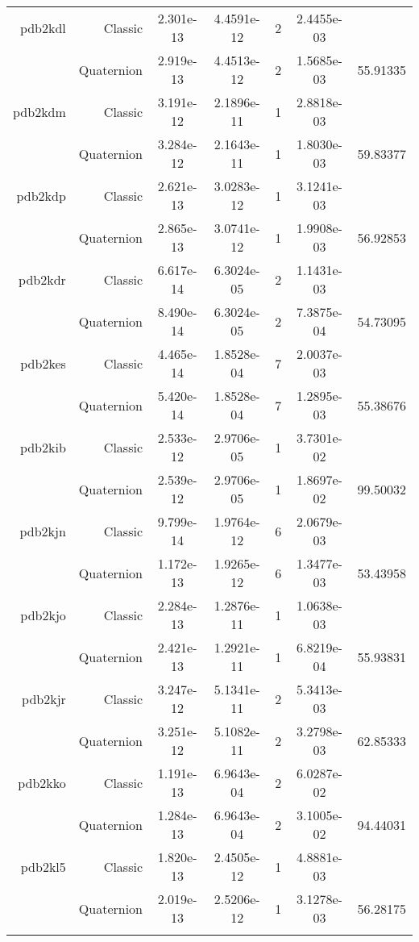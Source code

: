 \begin{xltabular}{\textwidth}{r|rS[table-format=1.3e+2]S[table-format=1.4e+2]cS[table-format=1.4e+2]S[table-format=-1.5]}
pdb2kdl & Classic & 2.301e-13 & 4.4591e-12 & 2 & 2.4455e-03 & \\
& Quaternion & 2.919e-13 & 4.4513e-12 & 2 & 1.5685e-03 & 55.91335\\  \addlinespace
pdb2kdm & Classic & 3.191e-12 & 2.1896e-11 & 1 & 2.8818e-03 & \\
& Quaternion & 3.284e-12 & 2.1643e-11 & 1 & 1.8030e-03 & 59.83377\\  \addlinespace
pdb2kdp & Classic & 2.621e-13 & 3.0283e-12 & 1 & 3.1241e-03 & \\
& Quaternion & 2.865e-13 & 3.0741e-12 & 1 & 1.9908e-03 & 56.92853\\  \addlinespace
pdb2kdr & Classic & 6.617e-14 & 6.3024e-05 & 2 & 1.1431e-03 & \\
& Quaternion & 8.490e-14 & 6.3024e-05 & 2 & 7.3875e-04 & 54.73095\\  \addlinespace
pdb2kes & Classic & 4.465e-14 & 1.8528e-04 & 7 & 2.0037e-03 & \\
& Quaternion & 5.420e-14 & 1.8528e-04 & 7 & 1.2895e-03 & 55.38676\\  \addlinespace
pdb2kib & Classic & 2.533e-12 & 2.9706e-05 & 1 & 3.7301e-02 & \\
& Quaternion & 2.539e-12 & 2.9706e-05 & 1 & 1.8697e-02 & 99.50032\\  \addlinespace
pdb2kjn & Classic & 9.799e-14 & 1.9764e-12 & 6 & 2.0679e-03 & \\
& Quaternion & 1.172e-13 & 1.9265e-12 & 6 & 1.3477e-03 & 53.43958\\  \addlinespace
pdb2kjo & Classic & 2.284e-13 & 1.2876e-11 & 1 & 1.0638e-03 & \\
& Quaternion & 2.421e-13 & 1.2921e-11 & 1 & 6.8219e-04 & 55.93831\\  \addlinespace
pdb2kjr & Classic & 3.247e-12 & 5.1341e-11 & 2 & 5.3413e-03 & \\
& Quaternion & 3.251e-12 & 5.1082e-11 & 2 & 3.2798e-03 & 62.85333\\  \addlinespace
pdb2kko & Classic & 1.191e-13 & 6.9643e-04 & 2 & 6.0287e-02 & \\
& Quaternion & 1.284e-13 & 6.9643e-04 & 2 & 3.1005e-02 & 94.44031\\  \addlinespace
pdb2kl5 & Classic & 1.820e-13 & 2.4505e-12 & 1 & 4.8881e-03 & \\
& Quaternion & 2.019e-13 & 2.5206e-12 & 1 & 3.1278e-03 & 56.28175\\  \addlinespace

\end{xltabular}
